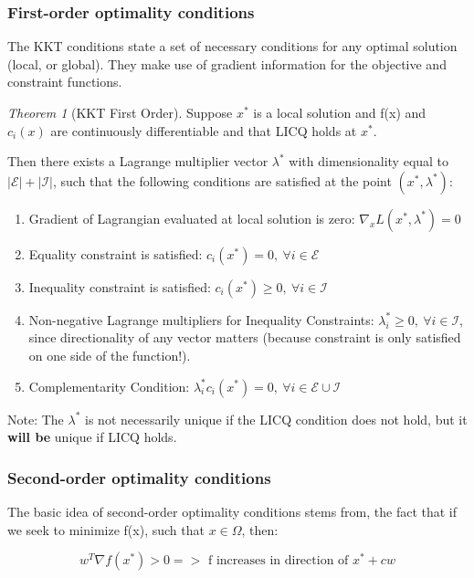 \documentclass[class=article, crop=false]{standalone}
\theoremstyle{definition}
\theoremstyle{remark}
\theoremstyle{lemma}
\theoremstyle{theorem}
\newtheorem*{theorem}{Theorem}
\theoremstyle{corollary}
\theoremstyle{property}
\begin{document}
		\subsubsection{First-order optimality conditions}
			The KKT conditions state a set of necessary conditions for any optimal solution (local, or global). They make use of gradient information for the objective and constraint functions.

			\begin{theorem}[KKT First Order]
				Suppose $x^*$ is a local solution and f(x) and $c_i(x)$ are continuously differentiable and that LICQ holds at $x^*$.

				Then there exists a Lagrange multiplier vector $\lambda^*$ with dimensionality equal to $|\mathcal{E}| + |\mathcal{I}|$, such that the following conditions are satisfied at the point $(x^*, \lambda^*)$:

				\begin{enumerate}
					\item Gradient of Lagrangian evaluated at local solution is zero: $\nabla_x L(x^*, \lambda^*) = 0$
					\item Equality constraint is satisfied: $c_i(x^*) =0, \ \forall i \in \mathcal{E}$
					\item Inequality constraint is satisfied: $c_i(x^*) \ge 0,\ \forall i \in \mathcal{I}$
					\item Non-negative Lagrange multipliers for Inequality Constraints: $\lambda_i^* \ge 0,\ \forall i \in \mathcal{I}$, since directionality of any vector matters (because constraint is only satisfied on one side of the function!).
					\item Complementarity Condition: $\lambda_i^* c_i(x^*) = 0,\ \forall i \in \mathcal{E} \cup \mathcal{I}$
				\end{enumerate}

				Note: The $\lambda^*$ is not necessarily unique if the LICQ condition does not hold, but it \textbf{will be} unique if LICQ holds.
			\end{theorem}
		\subsubsection{Second-order optimality conditions}
			The basic idea of second-order optimality conditions stems from, the fact that if we seek to minimize f(x), such that $x \in \Omega$, then:

				$$w^T \nabla f(x^*) > 0 => \text{ f increases in direction of $x^* + cw$}$$
\end{document}
